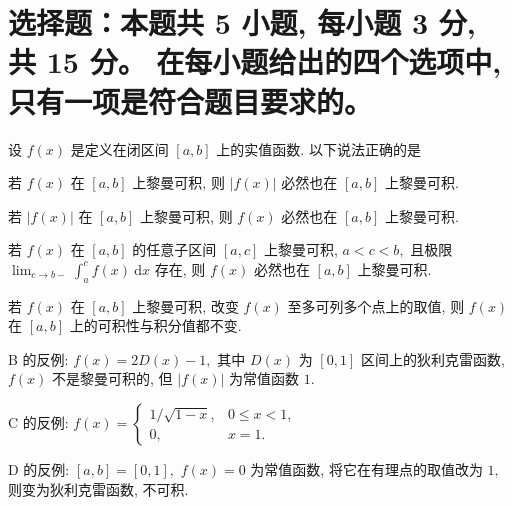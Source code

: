 


\makeexamtitle



\section{%
  选择题：本题共 5 小题, 每小题 3 分, 共 15 分。
  在每小题给出的四个选项中, 只有一项是符合题目要求的。
}


\begin{question}
设 $f(x)$ 是定义在闭区间 $[a, b]$ 上的实值函数. 以下说法正确的是 \paren[A]

\begin{choices}
\item 若 $f(x)$ 在 $[a, b]$ 上黎曼可积, 则 $|f(x)|$ 必然也在 $[a, b]$ 上黎曼可积.
\item 若 $|f(x)|$ 在 $[a, b]$ 上黎曼可积, 则 $f(x)$ 必然也在 $[a, b]$ 上黎曼可积.
\item 若 $f(x)$ 在 $[a, b]$ 的任意子区间 $[a, c]$ 上黎曼可积, $a < c < b,$ 且极限 $\displaystyle \lim_{c\to b-} \int_a^c f(x) ~ \mathrm{d} x$ 存在, 则 $f(x)$ 必然也在 $[a, b]$ 上黎曼可积.
\item 若 $f(x)$ 在 $[a, b]$ 上黎曼可积, 改变 $f(x)$ 至多可列多个点上的取值, 则 $f(x)$ 在 $[a, b]$ 上的可积性与积分值都不变.
\end{choices}
\end{question}

\begin{solution}
B 的反例: $f(x) = 2 D(x) - 1,$ 其中 $D(x)$ 为 $[0, 1]$ 区间上的狄利克雷函数, $f(x)$ 不是黎曼可积的, 但 $|f(x)|$ 为常值函数 $1.$

C 的反例: $\displaystyle f(x) = \begin{cases} 1/\sqrt{1- x}, & 0 \leqslant x < 1, \\ 0, & x = 1. \end{cases}$

D 的反例: $[a, b] = [0, 1],$ $f(x) = 0$ 为常值函数, 将它在有理点的取值改为 $1,$ 则变为狄利克雷函数, 不可积.
\end{solution}

